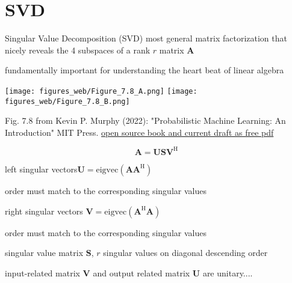 \documentclass[mathserif, aspectratio=43]{intbeamer}
\begin{document}
\section{SVD}
\begin{frame}{Singular Value Decomposition (SVD)}
most general matrix factorization that nicely reveals the 4 subspaces of a rank $r$ matrix $\bm{A}$

fundamentally important for understanding the heart beat of linear algebra

\texttt{[image: figures\_web/Figure\_7.8\_A.png]}
\texttt{[image: figures\_web/Figure\_7.8\_B.png]}

\begin{footnotesize}Fig. 7.8 from Kevin P. Murphy (2022): "Probabilistic Machine Learning: An Introduction" MIT Press. \href{https://probml.github.io/pml-book/book1.html}{open source book and current draft as free pdf}\end{footnotesize}

$$\bm{A} = \bm{U} \bm{S} \bm{V}^\mathrm{H}$$

left singular vectors\quad$\bm{U} = \mathrm{eigvec}(\bm{A}\bm{A}^\mathrm{H})$
\begin{footnotesize}order must match to the corresponding singular values\end{footnotesize}

right singular vectors $\bm{V} = \mathrm{eigvec}(\bm{A}^\mathrm{H}\bm{A})$
\begin{footnotesize}order must match to the corresponding singular values\end{footnotesize}

singular value matrix $\bm{S}$, $r$ singular values on diagonal descending order

input-related matrix $\bm{V}$ and output related matrix $\bm{U}$ are unitary....


\end{frame}
\end{document}
